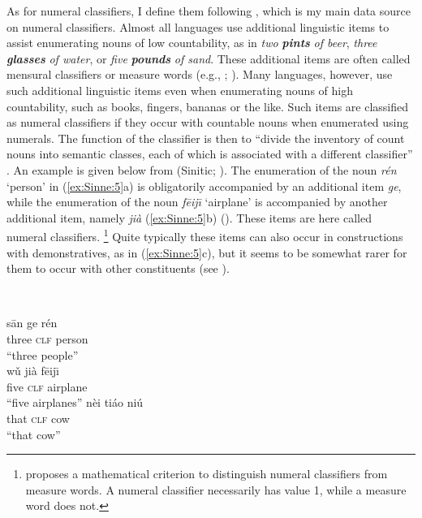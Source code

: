\documentclass[output=collectionpaper]{langsci/langscibook}
\begin{document}
As for numeral classifiers, I define them following \citet{Gil2013}, which is my main data source on numeral classifiers. Almost all languages use additional linguistic items to assist enumerating nouns of low countability, as in  \textit{two} \textbf{\textit{pints}} \textit{of beer}, \textit{three} \textbf{\textit{glasses}} \textit{of water}, or \textit{five} \textbf{\textit{pounds}} \textit{of sand}. These additional items are often called mensural classifiers or measure words (e.g., \citealt[260--261]{Grinevald2002}; \citealt{Her2012}). Many languages, however, use such additional linguistic items even when enumerating nouns of high countability, such as books, fingers, bananas or the like. Such items are classified as numeral classifiers if they occur with countable nouns when enumerated using numerals. The function of the classifier is then to ``divide the inventory of count nouns into semantic classes, each of which is associated with a different classifier'' \citep{Gil2013}. An example is given below from   (Sinitic; ). The enumeration of the noun \textit{rén} `person' in (\ref{ex:Sinne:5}a) is obligatorily accompanied by an additional item \textit{ge}, while the enumeration of the noun \textit{f\=eij\=\i} `airplane' is accompanied by another additional item, namely \textit{jià} (\ref{ex:Sinne:5}b) (\citealt[104]{Li1981}). These items are here called numeral classifiers.%
\footnote{\citet{Her2012} proposes a mathematical criterion to distinguish numeral classifiers from measure words. A numeral classifier necessarily has value 1, while a measure word does not.} %
Quite typically these items can also occur in constructions with demonstratives, as in (\ref{ex:Sinne:5}c), but it seems to be somewhat rarer for them to occur with other constituents (see \citealt[206--220]{Aikhenvald2000}).

\ea
\label{ex:Sinne:5}
\\
\begin{xlist}
\ex
\gll s\=an ge rén\\
three \textsc{clf} person\\
\glt ``three people''\\
\ex
\gll w\v{u} jià f\=eij\=\i\\
five \textsc{clf} airplane\\
\glt ``five airplanes''
\ex
\gll nèi tiáo niú\\
that \textsc{clf} cow\\
\glt ``that cow''
\end{xlist}
\z
\end{document}
